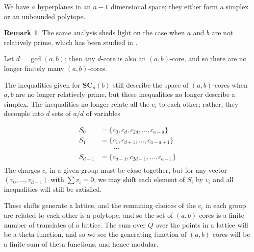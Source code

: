 \documentclass{amsart}[12pt]
\theoremstyle{definition}
\newtheorem{remark}[dummy]{Remark}
\newcommand{\DP}{\mathcal{DP}}
\newcommand{\SC}{\mathbf{SC}}
\begin{document}
We have $a$ hyperplanes in an $a-1$ dimensional space; they either
form a simplex or an unbounded polytope.



\begin{remark}  The same analysis sheds light on the case when $a$ and
  $b$ are not relatively prime, which has been studied in \cite{AKS}.

Let $d=\gcd(a,b)$; then any $d$-core is also an $(a,b)$-core, and so
there are no longer finitely many $(a,b)$-cores.

The inequalities given for $\SC_a(b)$ still describe the space of
$(a,b)$-cores when $a,b$ are no longer relatively prime, but these
inequalities no longer describe a simplex.  The inequalities no longer
relate all the $c_i$ to each other; rather, they decouple into $d$ sets of $a/d$ of variables

\begin{align*}
S_0 & =\{c_0, c_d, c_{2d},\dots, c_{a-d}\} \\
 S_1& =\{c_1,c_{d+1},\dots, c_{a-d+1}\} \\
& \quad \quad \cdots \\
S_{d-1}&=\{c_{d-1}, c_{2d-1},\dots, c_{a-1}\} \\
\end{align*}
The charges $c_i$ in a given group must be close together, but for any
vector $(v_0,\dots, v_{d-1})$ with $\sum v_i=0$, we may shift each
element of $S_i$ by $v_i$ and all inequalities will still be satisfied.

These shifts generate a lattice, and the remaining choices of the $c_i$ in each group are related to each other is a polytope, and so the set of $(a,b)$ cores is a finite number of translates of a lattice.  The sum over $Q$ over the points in a lattice will be a theta function, and so we see the generating function of $(a,b)$ cores will be a finite sum of theta functions, and hence modular.




\end{remark}



\end{document}
